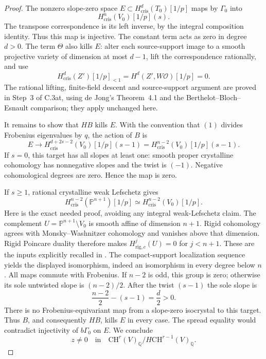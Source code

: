 \begin{proof}
The nonzero slope-zero space $E\subset H^d_{\mathrm{cris}}(T_0)[1/p]$
maps by $\Gamma_0$ into
\[
                       H^n_{\mathrm{cris}}(V_0)[1/p](s).
\]
The transpose correspondence is its left inverse, by the integral
composition identity. Thus this map is injective. The constant term
acts as zero in degree $d>0$. The term $\Theta$ also kills $E$:
alter each source-support image to a smooth projective variety of
dimension at most $d-1$, lift the correspondence rationally, and use
\[
 H^d_{\mathrm{cris}}(Z')[1/p]_{<1}
         =H^d(Z',W\mathcal O)[1/p]=0.
\]
The rational lifting, finite-field descent and source-support argument
are proved in Step~3 of C.3at, using de Jong's Theorem~4.1 and
the Berthelot--Bloch--Esnault comparison; they apply unchanged here.

It remains to show that $H B$ kills $E$. With the convention that
$(1)$ divides Frobenius eigenvalues by $q$, the action of $B$ is
\[
       E\longrightarrow
       H^{d+2s-2}_{\mathrm{cris}}(V_0)[1/p](s-1)
         =H^{n-2}_{\mathrm{cris}}(V_0)[1/p](s-1).
\]
If $s=0$, this target has all slopes at least one: smooth proper
crystalline cohomology has nonnegative slopes and the twist is $(-1)$.
Negative cohomological degrees are zero. Hence the map is zero.

If $s\ge1$, rational crystalline weak Lefschetz gives
\[
 H^{n-2}_{\mathrm{cris}}(\mathbb P^{n+1})[1/p]
        \simeq H^{n-2}_{\mathrm{cris}}(V_0)[1/p].
\]
Here is the exact needed proof, avoiding any integral weak-Lefschetz
claim. The complement $U=\mathbb P^{n+1}\setminus V_0$ is smooth
affine of dimension $n+1$. Rigid cohomology agrees with
Monsky--Washnitzer cohomology and vanishes above that dimension.
Rigid Poincare duality therefore makes $H^j_{\mathrm{rig},c}(U)=0$
for $j<n+1$. These are the inputs explicitly recalled in
\citet[proof of Corollary~1.2, author p.~4]{D_BerthelotBlochEsnault2007}.
The compact-support localization sequence yields the displayed
isomorphism, indeed an isomorphism in every degree below $n$.
All maps commute with Frobenius. If $n-2$ is odd, this group is zero;
otherwise its sole untwisted slope is $(n-2)/2$. After the twist
$(s-1)$ the sole slope is
\[
                         \frac{n-2}{2}-(s-1)=\frac d2>0.
\]
There is no Frobenius-equivariant map from a slope-zero isocrystal to
this target. Thus $B$, and consequently $HB$, kills $E$ in every case.
The spread equality would contradict injectivity of $b\Gamma_0$ on
$E$. We conclude
\[
                 z\ne0\quad\text{in}\quad
       \mathrm{CH}^r(V)_{\mathbb Q}/H\mathrm{CH}^{r-1}(V)_{\mathbb Q}.
\]


\end{proof}
